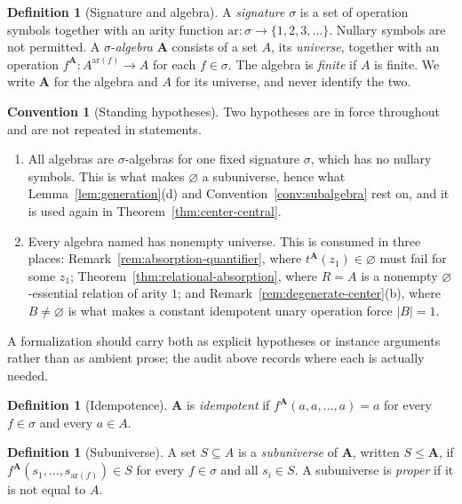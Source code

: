 \documentclass[11pt]{article}
\theoremstyle{mainplain}
\theoremstyle{mainroman}
\theoremstyle{definition}
\newtheorem{definition}[theorem]{Definition}
\newtheorem{convention}[theorem]{Convention}
\newcommand{\alphlabels}{\renewcommand{\labelenumi}{\textup{(\alph{enumi})}}%
  \renewcommand{\theenumi}{\alph{enumi}}}
\providecommand{\tightlist}{\setlength{\itemsep}{0pt}\setlength{\parskip}{0pt}}
\numberwithin{equation}{section}
\newcommand{\bA}{\mathbf A}
\begin{document}
\begin{definition}[Signature and algebra]\label{def:algebra}
A \emph{signature} $\sigma$ is a set of operation symbols together with an
arity function $\mathrm{ar}:\sigma\to\{1,2,3,\dots\}$. Nullary symbols are not
permitted. A $\sigma$-\emph{algebra} $\bA$ consists of a set $A$, its
\emph{universe}, together with an operation
$f^{\bA}:A^{\mathrm{ar}(f)}\to A$ for each $f\in\sigma$. The algebra is
\emph{finite} if $A$ is finite. We write $\bA$ for the algebra and $A$ for its
universe, and never identify the two.

\end{definition}

\begin{convention}[Standing hypotheses]\label{conv:standing}
Two hypotheses are in force throughout and are not repeated in statements.
\begin{enumerate}\alphlabels\tightlist
\item All algebras are $\sigma$-algebras for one fixed signature $\sigma$,
      which has no nullary symbols. This is what makes $\varnothing$ a
      subuniverse, hence what
      Lemma~\ref{lem:generation}(d) and Convention~\ref{conv:subalgebra} rest
      on, and it is used again in Theorem~\ref{thm:center-central}.
\item Every algebra named has nonempty universe. This is consumed in three
      places: Remark~\ref{rem:absorption-quantifier}, where
      $t^{\bA}(z_1)\in\varnothing$ must fail for some $z_1$;
      Theorem~\ref{thm:relational-absorption}, where $R=A$ is a nonempty
      $\varnothing$-essential relation of arity $1$; and
      Remark~\ref{rem:degenerate-center}(b), where $B\ne\varnothing$ is what
      makes a constant idempotent unary operation force $|B|=1$.
\end{enumerate}
A formalization should carry both as explicit hypotheses or instance
arguments rather than as ambient prose; the audit above records where each is
actually needed.
\end{convention}

\begin{definition}[Idempotence]\label{def:idempotent}
$\bA$ is \emph{idempotent} if $f^{\bA}(a,a,\dots,a)=a$ for every $f\in\sigma$
and every $a\in A$.
\end{definition}

\begin{definition}[Subuniverse]\label{def:subuniverse}
A set $S\subseteq A$ is a \emph{subuniverse} of $\bA$, written $S\le\bA$, if
$f^{\bA}(s_1,\dots,s_{\mathrm{ar}(f)})\in S$ for every $f\in\sigma$ and all
$s_i\in S$. A subuniverse is \emph{proper} if it is not equal to $A$.
\end{definition}
\end{document}
